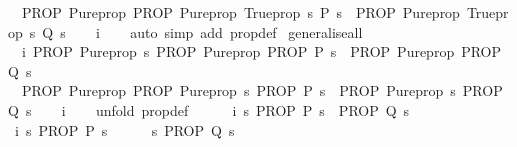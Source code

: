 \begin{isabellebody}
\ \ {\isachardoublequoteopen}PROP\ Pure{\isachardot}prop\ {\isacharparenleft}PROP\ Pure{\isachardot}prop\ {\isacharparenleft}Trueprop\ {\isacharparenleft}{\isasymforall}s{\isachardot}\ P\ s{\isacharparenright}{\isacharparenright}\ {\isasymLongrightarrow}\ PROP\ Pure{\isachardot}prop\ {\isacharparenleft}Trueprop\ {\isacharparenleft}{\isasymforall}s{\isachardot}\ Q\ s{\isacharparenright}{\isacharparenright}{\isacharparenright}{\isachardoublequoteclose}\isanewline
%
\isadelimproof
\ \ %
\endisadelimproof
%
\isatagproof
{}\isamarkupfalse%
\ i\isanewline
\ \ \isamarkupfalse%
\ {\isacharparenleft}auto\ simp\ add{\isacharcolon}\ prop{\isacharunderscore}def{\isacharparenright}%
\endisatagproof
{\isafoldproof}%
%
\isadelimproof
\isanewline
%
\endisadelimproof
\isanewline
{}\isamarkupfalse%
\ generalise{\isacharunderscore}all{\isacharcolon}\ \isanewline
\ \ i{\isacharcolon}\ {\isachardoublequoteopen}PROP\ Pure{\isachardot}prop\ {\isacharparenleft}{\isasymAnd}s{\isachardot}\ PROP\ Pure{\isachardot}prop\ {\isacharparenleft}PROP\ P\ s{\isacharparenright}\ {\isasymLongrightarrow}\ PROP\ Pure{\isachardot}prop\ {\isacharparenleft}PROP\ Q\ s{\isacharparenright}{\isacharparenright}{\isachardoublequoteclose}\ \isanewline
\ \ {\isachardoublequoteopen}PROP\ Pure{\isachardot}prop\ {\isacharparenleft}{\isacharparenleft}PROP\ Pure{\isachardot}prop\ {\isacharparenleft}{\isasymAnd}s{\isachardot}\ PROP\ P\ s{\isacharparenright}{\isacharparenright}\ {\isasymLongrightarrow}\ {\isacharparenleft}PROP\ Pure{\isachardot}prop\ {\isacharparenleft}{\isasymAnd}s{\isachardot}\ PROP\ Q\ s{\isacharparenright}{\isacharparenright}{\isacharparenright}{\isachardoublequoteclose}\isanewline
%
\isadelimproof
\ \ %
\endisadelimproof
%
\isatagproof
{}\isamarkupfalse%
\ i\isanewline
\ \ \isamarkupfalse%
\ {\isacharparenleft}unfold\ prop{\isacharunderscore}def{\isacharparenright}\isanewline
\ \ \ \ \isamarkupfalse%
\ i{}{\isacharcolon}\ {\isachardoublequoteopen}{\isasymAnd}s{\isachardot}\ {\isacharparenleft}PROP\ P\ s{\isacharparenright}\ {\isasymLongrightarrow}\ {\isacharparenleft}PROP\ Q\ s{\isacharparenright}{\isachardoublequoteclose}\isanewline
\ \ \ \ \isamarkupfalse%
\ i{}{\isacharcolon}\ {\isachardoublequoteopen}{\isasymAnd}s{\isachardot}\ PROP\ P\ s{\isachardoublequoteclose}\isanewline
\ \ \ \ \isamarkupfalse%
\ {\isachardoublequoteopen}{\isasymAnd}s{\isachardot}\ PROP\ Q\ s{\isachardoublequoteclose}\isanewline

\end{isabellebody}

